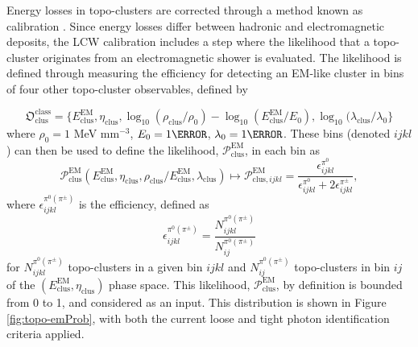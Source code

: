 Energy losses in topo-clusters are corrected through a method known as  calibration \cite{lcw-calib}. Since energy losses differ between hadronic and electromagnetic deposits, the \gls{LCW} calibration includes a step where the likelihood that a topo-cluster originates from an electromagnetic shower is evaluated. The likelihood is defined through measuring the efficiency for detecting an EM-like cluster in bins of four other topo-cluster observables, defined by

\begin{equation}
    \mathfrak{O}_{\text{clus}}^{\text{class}} = \{
        E_{\text{clus}}^{\text{EM}},
        \eta_{\text{clus}},
        \log_{10}(\rho_{\text{clus}} / \rho_{\text{0}}) - \log_{10}(E_{\text{clus}}^{\text{EM}} / E_{\text{0}}),
        \log_{10}(\lambda_{\text{clus}} / \lambda_{\text{0}}
    \}
\end{equation}
where $\rho_0 = 1$ MeV mm$^{-3}$, $E_0 = \unit{1}{\MeV}$, $\lambda_{0} = \unit{1}{\mm}$. These bins (denoted $ijkl$) can then be used to define the likelihood, $ \mathcal{P}_{\text{clus}}^{\text{EM}}$, in each bin as
\begin{equation}
    \mathcal{P}_{\text{clus}}^{\text{EM}} ( E_{\text{clus}}^{\text{EM}}, \eta_{\text{clus}}, \rho_{\text{clus}} / E_{\text{clus}}^{\text{EM}}, \lambda_{\text{clus}}) \mapsto \mathcal{P}_{\text{clus}, ijkl}^{\text{EM}}  = \frac{\epsilon^{\pi^0}_{ijkl}}{ \epsilon^{\pi^0}_{ijkl} + 2\epsilon^{\pi^\pm}_{ijkl}},
\end{equation}
where $\epsilon^{\pi^0(\pi^\pm)}_{ijkl}$ is the efficiency, defined as
\begin{equation}
    \epsilon^{\pi^0(\pi^\pm)}_{ijkl} = \frac{ N^{\pi^0(\pi^\pm)}_{ijkl} }{N^{\pi^0(\pi^\pm)}_{ij}}
\end{equation}
for $N^{\pi^0(\pi^\pm)}_{ijkl}$ topo-clusters in a given bin $ijkl$ and $N^{\pi^0(\pi^\pm)}_{ij}$ topo-clusters in bin $ij$ of the $(E_{\text{clus}}^{\text{EM}}, \eta_{\text{clus}})$ phase space. This likelihood, $\mathcal{P}_{\text{clus}}^{\text{EM}}$, by definition is bounded from 0 to 1, and considered as an input. This distribution is shown in Figure \ref{fig:topo-emProb}, with both the current loose and tight photon identification criteria applied.


